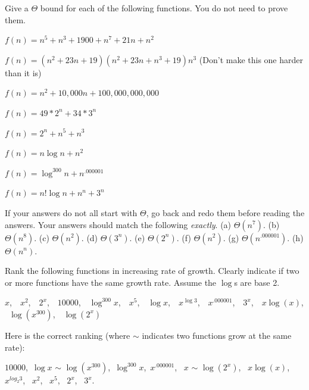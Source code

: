 \begin{exer}
Give a $\Theta$ bound for each of the following functions. You do not need to prove them.
\begin{lenum}
  \setlength{\itemsep}{.5in}
\item $f(n) = n^5 + n^3 + 1900 + n^7 + 21n + n^2 $
\item $f(n) = (n^2+23n+19 ) (n^2+23n+ n^3+19 ) n^3 $  (Don't make this one harder than it is)
\item $f(n) = n^2  + 10,000n + 100,000,000,000 $
\item $f(n) = 49*2^n+34*3^n $
\item $f(n) = 2^n + n^5 + n^3$
\item $f(n) = n \log n + n^2$
\item $f(n) = \log^{300} n + n^{.000001}$
\item $f(n) = n!\log n + n^n+3^n$
\end{lenum}
\vspace*{.45in}
\begin{answer}
If your answers do not all start with $\Theta$, go back and redo them before reading the answers.  Your answers should match the following {\em exactly}.
(a) $\Theta(n^7)$.
(b) $\Theta(n^8)$.
(c) $\Theta(n^2)$.
(d) $\Theta(3^n)$.
(e) $\Theta(2^n)$.
(f) $\Theta(n^2)$.
(g) $\Theta(n^{.000001})$.
(h) $\Theta(n^n)$.
\end{answer}
\end{exer}

\newpage %

\begin{exer}
Rank the following functions in increasing rate of growth.
Clearly indicate if two or more functions have the same growth rate.
Assume the $\log$s are base 2.
\medskip

\noindent
$x$,\, \,  
$x^2$,\, \,  
$2^x$,\, \,  
$10000$,\, \,    
$\log^{300} x$,\, \,   
$x^{5}$,\, \,   
$\log x$,\, \,   
$x^{\log 3}$,\, \,    
$x^{.000001}$,\, \,     
$3^x$,\, \,  
$x \log(x)$,\, \,  
$\log (x^{300})$,\, \,   
$\log(2^x)$

\vspace*{3.5in}
\begin{answer}
Here is the correct ranking (where $\sim$ indicates two functions grow at the same rate):

\noindent
$10000$,\, 
$\log x$ $\sim$ $\log (x^{300})$,\, 
$\log^{300} x$,\, 
$x^{.000001}$, \,   
$x$ $\sim$ $\log(2^x)$,  \,   
$x \log(x)$,  \,   
$x^{log_2 3}$, \,   
$x^2$, \,   
$x^{5}$, \,   
$2^x$,  \,   
$3^x$.
\end{answer}
\end{exer}



